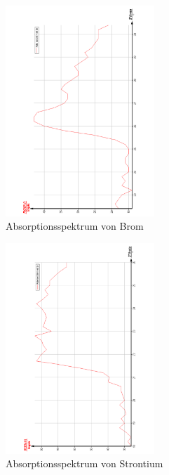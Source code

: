 \begin{figure}
  \centering
  \includegraphics[width=0.5\textwidth, angle=270]{bilder/AbsorpBr.pdf}
  \caption{Absorptionsspektrum von Brom}
  \label{fig:Brom}
\end{figure}

\begin{figure}
  \centering
  \includegraphics[width=0.5\textwidth, angle=270]{bilder/AbsorpSr.pdf}
  \caption{Absorptionsspektrum von Strontium}
  \label{fig:Strontium}
\end{figure}

